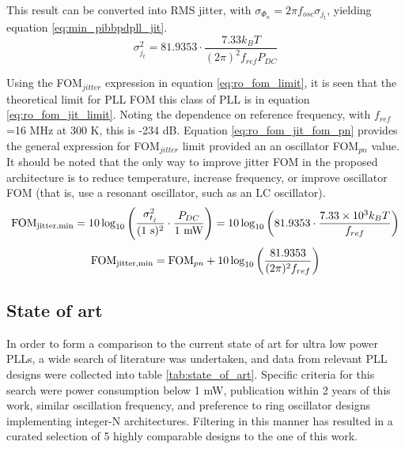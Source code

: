 	 This result can be converted into RMS jitter, with $\sigma_{\Phi_{n}} = 2\pi f_{osc}\sigma_{j_t}$, yielding equation \ref{eq:min_pibbpdpll_jit}.
	\begin{equation}\label{eq:min_pibbpdpll_jit}
		\sigma_{j_t}^2 = 81.9353\cdot  \frac{7.33 k_B T}{(2\pi)^2f_{ref}P_{DC}}
	\end{equation}


	  Using the FOM$_{jitter}$ expression in equation \ref{eq:ro_fom_limit}, it is seen that the theoretical limit for PLL FOM this class of PLL is in equation \ref{eq:ro_fom_jit_limit}. Noting the dependence on reference frequency, with $f_{ref}$=16 MHz at 300 K, this is -234 dB. Equation \ref{eq:ro_fom_jit_fom_pn} provides the general expression for FOM$_{jitter}$ limit provided an an oscillator FOM$_{pn}$ value. It should be noted that the only way to improve jitter FOM in the proposed architecture is to reduce temperature, increase frequency, or improve oscillator FOM (that is, use a resonant oscillator, such as an LC oscillator).
	\begin{equation}\label{eq:ro_fom_jit_limit}
		\textnormal{FOM}_{\textnormal{jitter,min}} = 10\log_{10}\left(\frac{\sigma_{t_j}^2}{(\textnormal{1 s})^2}\cdot\frac{P_{DC}}{\textnormal{1 mW}}\right) =  10\log_{10}\left( 81.9353\cdot  \frac{7.33\times 10^3 k_B T}{f_{ref}} \right)
	\end{equation}
	\begin{equation}\label{eq:ro_fom_jit_fom_pn}
		\textnormal{FOM}_{\textnormal{jitter,min}} = \textnormal{FOM}_{pn} + 10\log_{10}\left(\frac{81.9353}{(2\pi)^2 f_{ref}} \right)
	\end{equation}

\subsection{State of art}
In order to form a comparison to the current state of art for ultra low power PLLs, a wide search of  literature was undertaken, and data from relevant PLL designs were collected into table \ref{tab:state_of_art}. Specific criteria for this search were power consumption below 1 mW, publication within 2 years of this work, similar oscillation frequency, and preference to ring oscillator designs implementing integer-N architectures. Filtering in this manner has resulted in a curated selection of 5 highly comparable designs to the one of this work.

